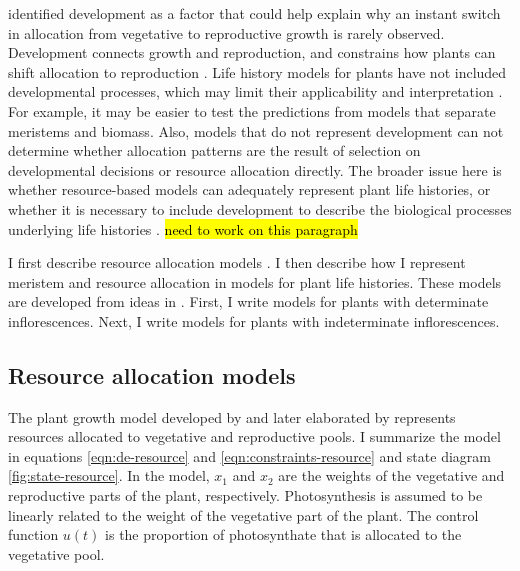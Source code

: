 \documentclass[12pt, oneside]{article}   	%
\begin{document}
\cite{cohen1971} identified development as a factor that could help explain why an instant switch in allocation from vegetative to reproductive growth is rarely observed. Development connects growth and reproduction, and constrains how plants can shift allocation to reproduction \cite{fox1992}. Life history models for plants have not included developmental processes, which may limit their applicability and interpretation \cite{fox1992}. For example, it may be easier to test the predictions from models that separate meristems and biomass. Also, models that do not represent development can not determine whether allocation patterns are the result of selection on developmental decisions or resource allocation directly. The broader issue here is whether resource-based models can adequately represent plant life histories, or whether it is necessary to include development to describe the biological processes underlying life histories \cite{fox1992}. \hl{need to work on this paragraph}

I first describe resource allocation models \cite{cohen1971,King1982a}. I then describe how I represent meristem and resource allocation in models for plant life histories. These models are developed from ideas in \cite{fox1992,kellogg2000,Prusinkiewicz2007,itzkovitz2012}. First, I write models for plants with determinate inflorescences. Next, I write models for plants with indeterminate inflorescences. 


\subsection{Resource allocation models}

The plant growth model developed by \cite{cohen1971} and later elaborated by \cite{King1982a} represents resources allocated to vegetative and reproductive pools. I summarize the model in equations \ref{eqn:de-resource} and \ref{eqn:constraints-resource} and state diagram \ref{fig:state-resource}. In the model, $x_1$ and $x_2$ are the weights of the vegetative and reproductive parts of the plant, respectively. Photosynthesis is assumed to be linearly related to the weight of the vegetative part of the plant. The control function $u(t)$ is the proportion of photosynthate that is allocated to the vegetative pool.
\end{document}
